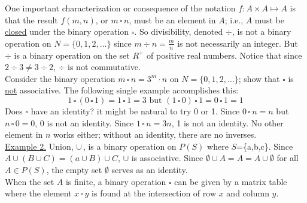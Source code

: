 \documentclass[12pt]{article}
\theoremstyle{definition}
\begin{document}
One important characterization or consequence of the notation $f:A\times A\mapsto A$ is that the result $f(m,n)$, or $m\,\square\, n$, must be an element in $A$; i.e., $A$ must be \underline {closed} under the binary operation $\square$.  So divisibility, denoted $\div$, is not a binary operation on $N=\{0,1,2,\dots\}$ since $m\div n = \frac m n$ is not necessarily an integer.  But $\div$ is a binary operation on the set $R^+$ of positive real numbers.  Notice that since $2\div3\neq3\div2$, $\div$ is not commutative.\\[.5in]

Consider the binary operation $m\,\square\, n=3^m\cdot n$ on $N=\{0,1,2,\dots\}$; show that $\square$ is \underline{not} associative.  The following single example accomplishes this:
$$1\,\square\,(0\,\square\, 1) = 1\,\square\, 1 = 3\text{ but }(1\,\square\, 0)\,\square\, 1 = 0\,\square\, 1 = 1$$
Does $\square$ have an identity?  it might be natural to try 0 or 1.  Since $0\,\square\, n = n$ but $n\,\square\, 0=0$, 0 is not an identity.  Since $1\,\square\, n = 3n$, 1 is not an identity.  No other element in $n$ works either;  without an identity, there are no inverses.\\[.5in]
\underline{Example 2.}  Union, $\cup\,$, is a binary operation on $P(S)$ where $S$=\{a,b,c\}.  Since $A\cup(B\cup C)=(a\cup B)\cup C$, $\cup$ is associative.   Since $\emptyset \cup A=A=A\cup\emptyset$ for all $A\in P(S)$, the empty set $\emptyset$ serves as an identity.\\[.25in]
When the set $A$ is finite, a binary operation $\square$ can be given by a matrix table where the element $x\,\square\, y$ is found at the intersection of row $x$ and column $y$.
\end{document}
